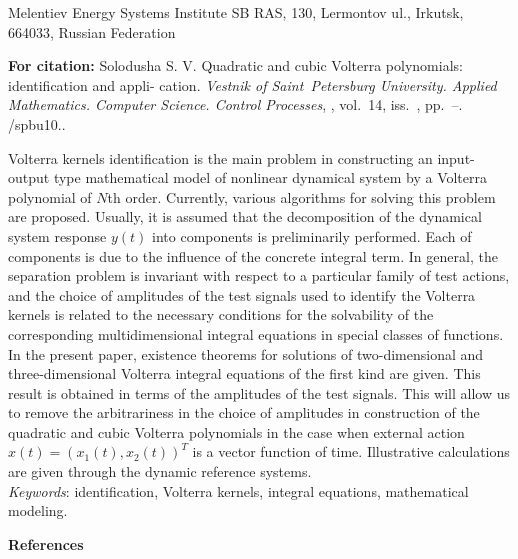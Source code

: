 
{\normalsize

\vskip 6mm


}

\vskip 1.5mm

{\small


\vskip 1.5mm

{\footnotesize \noindent Melentiev Energy Systems Institute SB
RAS, 130, Lermontov ul., Irkutsk, 664033, Russian Federation

}

\vskip3mm

\noindent \textbf{For citation:}  Solodusha S. V. Quadratic and
cubic Volterra polynomials: identification and appli-\linebreak
cation. {\it Vestnik of Saint~Petersburg University. Applied
Mathematics. Computer Science. Control Processes}, \issueyear,
vol.~14, iss.~\issuenum, pp.~\pageref{p5}--\pageref{p5e}.
\doivyp/spbu10.\issueyear.

\vskip3mm

{\leftskip=7mm\noindent Volterra kernels identification is the
main problem in constructing an input-output type mathematical
model of nonlinear dynamical system by a Volterra polynomial of
$N$th order. Currently, various algorithms for solving this
problem are proposed. Usually, it is assumed that the
decomposition of the dynamical system response $y(t)$ into
components is preliminarily performed. Each of components is due
to the influence of the concrete integral term. In general, the
separation problem is invariant with respect to a particular
family of test actions, and the choice of amplitudes of the test
signals used to identify the Volterra kernels is related to the
necessary conditions for the solvability of the corresponding
multidimensional integral equations in special classes of
functions. In the present paper, existence theorems for solutions
of two-dimensional and three-dimensional Volterra integral
equations of the first kind are given. This result is obtained in
terms of the amplitudes of the test signals. This will allow us to
remove the arbitrariness in the choice of amplitudes in
construction of the quadratic and cubic Volterra polynomials in
the case when external action $x (t) = (x_1 (t), x_2 (t))^T$ is a
vector function of time. Illustrative calculations are given
through the dynamic reference systems.\\[1mm]
\textit{Keywords}: identification, Volterra kernels, integral
equations, mathematical modeling.
\par}

\vskip5mm

\noindent \textbf{References} }

